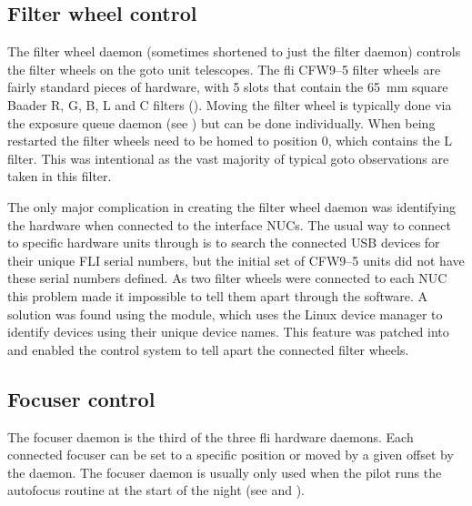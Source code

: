 \begin{colsection}
\begin{colsection}
\end{colsection}


\subsection{Filter wheel control}
\label{sec:filt}
\begin{colsection}

The filter wheel daemon (sometimes shortened to just the filter daemon) controls the filter wheels on the \gls{goto} unit telescopes. The \gls{fli} CFW9--5 filter wheels are fairly standard pieces of hardware, with 5 slots that contain the \SI{65}{\milli\metre} square Baader R, G, B, L and C filters (). Moving the filter wheel is typically done via the exposure queue daemon (see ) but can be done individually. When being restarted the filter wheels need to be homed to position 0, which contains the L filter. This was intentional as the vast majority of typical \gls{goto} observations are taken in this filter.

The only major complication in creating the filter wheel daemon was identifying the hardware when connected to the interface NUCs. The usual way to connect to specific hardware units through  is to search the connected USB devices for their unique FLI serial numbers, but the initial set of CFW9--5 units did not have these serial numbers defined. As two filter wheels were connected to each NUC this problem made it impossible to tell them apart through the software. A solution was found using the   module, which uses the Linux  device manager to identify devices using their unique device names. This feature was patched into  and enabled the control system to tell apart the connected filter wheels.

\end{colsection}


\subsection{Focuser control}
\label{sec:foc}
\begin{colsection}

The focuser daemon is the third of the three \gls{fli} hardware daemons. Each connected focuser can be set to a specific position or moved by a given offset by the daemon. The focuser daemon is usually only used when the pilot runs the autofocus routine at the start of the night (see  and ).


\end{colsection}
\end{colsection}
